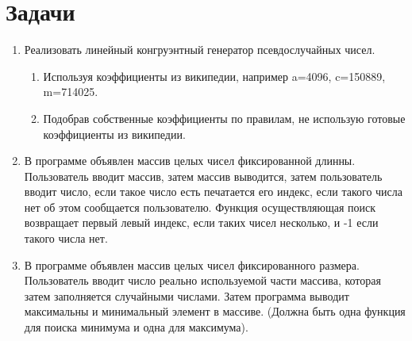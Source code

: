 \documentclass[12pt]{article}
\begin{document}
\section{Задачи}

\begin{enumerate}
 \item Реализовать линейный конгруэнтный генератор псевдослучайных чисел.
   \begin{enumerate}
    \item Используя коэффициенты из википедии, например a=4096, c=150889, m=714025.
    \item Подобрав собственные коэффициенты по правилам, не использую готовые коэффициенты из википедии. 
   \end{enumerate}

 \item В программе объявлен массив целых чисел фиксированной длинны. Пользователь вводит массив, затем массив выводится, затем пользователь вводит число, если такое число есть печатается его индекс, если такого числа нет об этом сообщается пользователю. Функция осуществляющая поиск возвращает первый левый индекс, если таких чисел несколько, и -1 если такого числа нет.
 \item В программе объявлен массив целых чисел фиксированного размера. Пользователь вводит число реально используемой части массива, которая затем заполняется случайными числами. Затем программа выводит максимальны и минимальный элемент в массиве. (Должна быть одна функция для поиска минимума и одна для максимума).
\end{enumerate}
\end{document}
